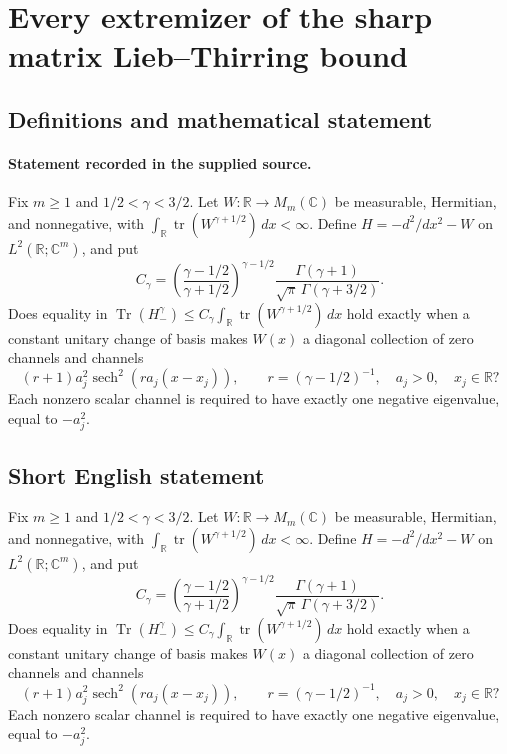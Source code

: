 \documentclass[11pt]{article}
\begin{document}
\section*{Every extremizer of the sharp matrix Lieb–Thirring bound}\label{30007233}
\subsection{Definitions and mathematical statement}
\paragraph{Statement recorded in the supplied source.}
Fix $m\geq1$ and $1/2<\gamma<3/2$. Let $W:\mathbb R\to M_m(\mathbb C)$ be measurable, Hermitian, and nonnegative, with $\int_{\mathbb R}\operatorname{tr}(W^{\gamma+1/2})\,dx<\infty$. Define $H=-d^2/dx^2-W$ on $L^2(\mathbb R;\mathbb C^m)$, and put
\[C_\gamma=\left(\frac{\gamma-1/2}{\gamma+1/2}\right)^{\gamma-1/2}\frac{\Gamma(\gamma+1)}{\sqrt\pi\,\Gamma(\gamma+3/2)}.\]
Does equality in $\operatorname{Tr}(H_-^\gamma)\leq C_\gamma\int_{\mathbb R}\operatorname{tr}(W^{\gamma+1/2})\,dx$ hold exactly when a constant unitary change of basis makes $W(x)$ a diagonal collection of zero channels and channels
\[(r+1)a_j^2\operatorname{sech}^2(r a_j(x-x_j)),\qquad r=(\gamma-1/2)^{-1},\quad a_j>0,\quad x_j\in\mathbb R?\]
Each nonzero scalar channel is required to have exactly one negative eigenvalue, equal to $-a_j^2$.
\subsection{Short English statement}
Fix $m\geq1$ and $1/2<\gamma<3/2$. Let $W:\mathbb R\to M_m(\mathbb C)$ be measurable, Hermitian, and nonnegative, with $\int_{\mathbb R}\operatorname{tr}(W^{\gamma+1/2})\,dx<\infty$. Define $H=-d^2/dx^2-W$ on $L^2(\mathbb R;\mathbb C^m)$, and put
\[C_\gamma=\left(\frac{\gamma-1/2}{\gamma+1/2}\right)^{\gamma-1/2}\frac{\Gamma(\gamma+1)}{\sqrt\pi\,\Gamma(\gamma+3/2)}.\]
Does equality in $\operatorname{Tr}(H_-^\gamma)\leq C_\gamma\int_{\mathbb R}\operatorname{tr}(W^{\gamma+1/2})\,dx$ hold exactly when a constant unitary change of basis makes $W(x)$ a diagonal collection of zero channels and channels
\[(r+1)a_j^2\operatorname{sech}^2(r a_j(x-x_j)),\qquad r=(\gamma-1/2)^{-1},\quad a_j>0,\quad x_j\in\mathbb R?\]
Each nonzero scalar channel is required to have exactly one negative eigenvalue, equal to $-a_j^2$.
\end{document}
